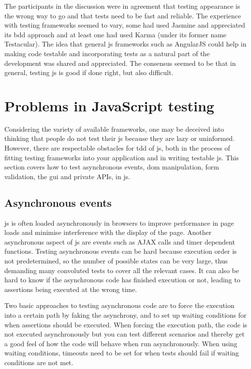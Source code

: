 \documentclass[11pt]{article}
\begin{document}
The participants in the discussion were in agreement that testing appearance is the wrong way to go and that tests need to be fast and reliable. The experience with testing frameworks seemed to vary, some had used Jasmine and appreciated its \gls{bdd} approach and at least one had used Karma (under its former name Testacular). The idea that general \gls{js} frameworks such as AngularJS could help in making code testable and incorporating tests as a natural part of the development was shared and appreciated. The consensus seemed to be that in general, testing \gls{js} is good if done right, but also difficult.


\section{Problems in JavaScript testing}
\label{sec:jsproblems}

Considering the variety of available frameworks, one may be deceived into thinking that people do not test their \gls{js} because they are lazy or uninformed. However, there are respectable obstacles for \gls{tdd} of \gls{js}, both in the process of fitting testing frameworks into your application and in writing testable \gls{js}. This section covers how to test asynchronous events, \gls{dom} manipulation, form validation, the \gls{gui} and private APIs, in \gls{js}.

\subsection{Asynchronous events}
\label{subsec:asynchronous}

\gls{js} is often loaded asynchronously in browsers to improve performance in page loads and minimise interference with the display of the page. Another asynchronous aspect of \gls{js} are events such as AJAX calls and timer dependent functions. Testing asynchronous events can be hard because execution order is not predetermined, so the number of possible states can be very large, thus demanding many convoluted tests to cover all the relevant cases. It can also be hard to know if the asynchronous code has finished execution or not, leading to assertions being executed at the wrong time.

Two basic approaches to testing asynchronous code are to force the execution into a certain path by faking the asynchrony, and to set up waiting conditions for when assertions should be executed. When forcing the execution path, the code is not executed asynchronously but you can test different scenarios and thereby get a good feel of how the code will behave when run asynchronously. When using waiting conditions, timeouts need to be set for when tests should fail if waiting conditions are not met.
\end{document}
